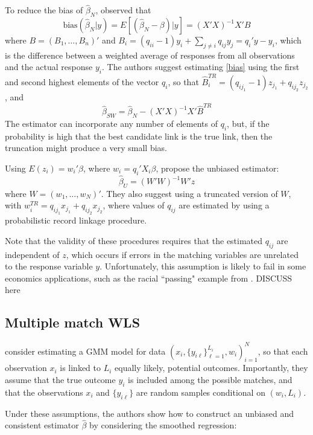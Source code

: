 \documentclass[12pt]{article}
\begin{document}
\begin{enumerate}
To reduce the bias of $\hat{\beta}_N$, \cite{sw1993} observed that 
\begin{equation} \text{bias} (\hat{\beta}_N | y) = E[(\hat{\beta}_N - \beta) | y ] = (X'X)^{-1} X'B \label{bias} \end{equation}
where $B = (B_1, \dots, B_n)'$ and $B_i = (q_{ii}-1)y_i + \sum_{j\neq i } q_{ij} y_j = q_i'y - y_i$, which is the difference between a weighted average of responses from all observations and the actual response $y_i$.  The authors suggest estimating \ref{bias} using the first and second highest elements of the vector $q_i$, so that $\hat{B}_i^{TR} = (q_{ij_1} - 1) z_{j_1} + q_{ij_2} z_{j_2}$, and 
\begin{equation} \hat{\beta}_{SW} = \hat{\beta}_N - (X'X)^{-1} X' \hat{B}^{TR} \label{sw}\end{equation}
The estimator can incorporate any number of elements of $q_i$, but, if the probability is high that the best candidate link is the true link, then the truncation might produce a very small bias. 

Using $E(z_i) = w_i'\beta$, where $w_i = q_i'X_i\beta$, \cite{lahiri05} propose the unbiased estimator:
$$ \hat{\beta}_U = (W'W)^{-1} W'z$$ 
where $W = (w_1, \dots, w_N)'$.  They also suggest using a truncated version of $W$, with $w_i^{TR} = q_{ij_1} x_{j_1} + q_{ij_2} x_{j_2}$, where values of $q_{ij}$ are estimated by using a probabilistic record linkage procedure.  

Note that the validity of these procedures requires that the estimated $q_{ij}$ are independent of $z$, which occurs if errors in the matching variables are unrelated to the response variable $y$.  Unfortunately, this assumption is likely to fail in some economics applications, such as the racial ``passing" example from \cite{nq2015}.  DISCUSS here

\subsection{Multiple match WLS}

 \cite{ahl2019} consider estimating a GMM model for data $(x_i, \{y_{i\ell}\}_{\ell=1}^{L_i}, w_i)_{i=1}^N$, so that each observation $x_i$ is linked to $L_i$ equally likely, potential outcomes.  Importantly, they assume that the true outcome $y_i$ is included among the possible matches, and that the observations $x_i$ and $\{y_{i\ell}\}$ are random samples conditional on $(w_i, L_i)$.  
 
Under these assumptions, the authors show how to construct an unbiased and consistent estimator $\hat{\beta}$ by considering the smoothed regression:


\end{enumerate}
\end{document}
